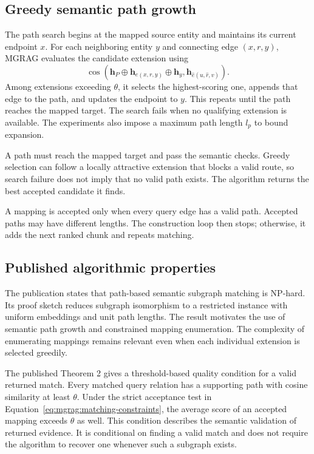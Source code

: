 \subsection{Greedy semantic path growth}

The path search begins at the mapped source entity and maintains its current endpoint $x$. For each neighboring entity $y$ and connecting edge $(x,r,y)$, MGRAG evaluates the candidate extension using
\begin{equation}
 \cos\!\left(\mathbf h_P\oplus\mathbf h_{e(x,r,y)}\oplus\mathbf h_y,
 \mathbf h_{\widehat e(u,\widehat r,v)}\right).
\label{eq:mgrag:greedy-score}
\end{equation}
Among extensions exceeding $\theta$, it selects the highest-scoring one, appends that edge to the path, and updates the endpoint to $y$. This repeats until the path reaches the mapped target. The search fails when no qualifying extension is available. The experiments also impose a maximum path length $l_p$ to bound expansion.

A path must reach the mapped target and pass the semantic checks. Greedy selection can follow a locally attractive extension that blocks a valid route, so search failure does not imply that no valid path exists. The algorithm returns the best accepted candidate it finds.

A mapping is accepted only when every query edge has a valid path. Accepted paths may have different lengths. The construction loop then stops; otherwise, it adds the next ranked chunk and repeats matching.

\subsection{Published algorithmic properties}

The publication states that path-based semantic subgraph matching is NP-hard. Its proof sketch reduces subgraph isomorphism to a restricted instance with uniform embeddings and unit path lengths. The result motivates the use of semantic path growth and constrained mapping enumeration. The complexity of enumerating mappings remains relevant even when each individual extension is selected greedily.

The published Theorem 2 gives a threshold-based quality condition for a valid returned match. Every matched query relation has a supporting path with cosine similarity at least $\theta$. Under the strict acceptance test in Equation~\ref{eq:mgrag:matching-constraints}, the average score of an accepted mapping exceeds $\theta$ as well. This condition describes the semantic validation of returned evidence. It is conditional on finding a valid match and does not require the algorithm to recover one whenever such a subgraph exists.

